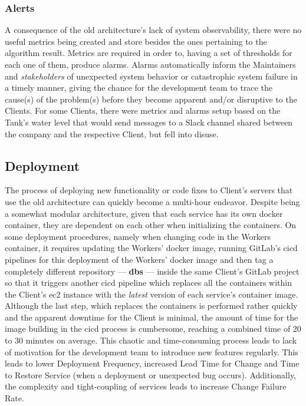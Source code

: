 \subsubsection{Alerts}\label{methodology:sss:alerts}
A consequence of the old architecture's lack of system observability, there were no useful metrics being created and store besides the ones pertaining to the algorithm result. Metrics are required in order to, having a set of thresholds for each one of them, produce alarms. Alarms automatically inform the Maintainers and \textit{stakeholders} of unexpected system behavior or catastrophic system failure in a timely manner, giving the chance for the development team to trace the cause(s) of the problem(s) before they become apparent and/or disruptive to the Clients. For some Clients, there were metrics and alarms setup based on the Tank's water level that would send messages to a Slack channel shared between the company and the respective Client, but fell into disuse.



\subsection{Deployment}\label{methodology:ss:deployment}

The process of deploying new functionality or code fixes to Client's servers that use the old architecture can quickly become a multi-hour endeavor. Despite being a somewhat modular architecture, given that each service has its own docker container, they are dependent on each other when initializing the containers. On some deployment procedures, namely when changing code in the Workers container, it requires updating the Workers' docker image, running GitLab's \gls{cicd} pipelines for this deployment of the Workers' docker image and then tag a completely different repository —  \textbf{dbs} — inside the same Client's GitLab project so that it triggers another \gls{cicd} pipeline which replaces all the containers within the Client's \gls{ec2} instance with the \textit{latest} version of each service's container image. Although the last step, which replaces the containers is performed rather quickly and the apparent downtime for the Client is minimal, the amount of time for the image building in the \gls{cicd} process is cumbersome, reaching a combined time of 20 to 30 minutes on average. This chaotic and time-consuming process leads to lack of motivation for the development team to introduce new features regularly. This leads to lower Deployment Frequency, increased Lead Time for Change and Time to Restore Service (when a deployment or unexpected bug occurs). Additionally, the complexity and tight-coupling of services leads to increase Change Failure Rate. 

